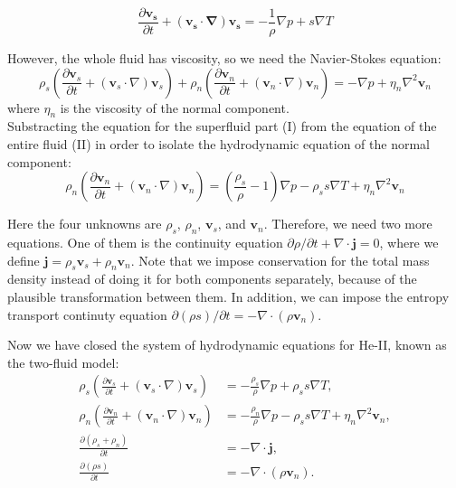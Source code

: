 \documentclass{article}
\begin{document}
\[\frac{\partial \mathbf{v_s}}{\partial t} + (\mathbf{v_s}\cdot \mathbf{\nabla})\mathbf{v_s} = -\frac{1}{\rho}\nabla p + s \nabla T \tag{I}\]

However, the whole fluid has viscosity, so we need the Navier-Stokes equation:
\[
\rho_s \left( \frac{\partial \mathbf{v}_s}{\partial t} + (\mathbf{v}_s \cdot \nabla) \mathbf{v}_s \right) + \rho_n \left( \frac{\partial \mathbf{v}_n}{\partial t} + (\mathbf{v}_n \cdot \nabla) \mathbf{v}_n \right) = -\nabla p + \eta_n \nabla^2 \mathbf{v}_n \tag{II}
\]
where $\eta_n$ is the viscosity of the normal component.
\\

Substracting the equation for the superfluid part (I) from the equation of the entire fluid (II) in order to isolate the hydrodynamic equation of the normal component:
\[
\rho_n \left( \frac{\partial \mathbf{v}_n}{\partial t} + (\mathbf{v}_n \cdot \nabla) \mathbf{v}_n \right) = \left( \frac{\rho_s}{\rho} - 1 \right) \nabla p - \rho_s s \nabla T + \eta_n \nabla^2 \mathbf{v}_n \]

Here the four unknowns are $\rho_s$, $\rho_n$, $\mathbf{v}_s$, and $\mathbf{v}_n$. Therefore, we need two more equations. One of them is the continuity equation $\partial \rho / \partial t + \nabla \cdot \mathbf{j} = 0$, where we define $\mathbf{j} = \rho_s \mathbf{v}_s + \rho_n \mathbf{v}_n $. Note that we impose conservation for the total mass density instead of doing it for both components separately, because of the plausible transformation between them. In addition, we can impose the entropy transport continuty equation $\partial (\rho s) / \partial t = - \nabla \cdot (\rho \mathbf{v}_n)$.

Now we have closed the system of hydrodynamic equations for He-II, known as the two-fluid model:
\begin{align}
\rho_s \left( \frac{\partial \mathbf{v}_s}{\partial t} + (\mathbf{v}_s \cdot \nabla) \mathbf{v}_s \right) &= -\frac{\rho_s}{\rho} \nabla p + \rho_s s \nabla T,  \\
\rho_n \left( \frac{\partial \mathbf{v}_n}{\partial t} + (\mathbf{v}_n \cdot \nabla) \mathbf{v}_n \right) &= -\frac{\rho_n}{\rho} \nabla p - \rho_s s \nabla T + \eta_n \nabla^2 \mathbf{v}_n,  \\
\frac{\partial (\rho_s + \rho_n)}{\partial t} &= -\nabla \cdot \mathbf{j}, \\
\frac{\partial (\rho s)}{\partial t} &= -\nabla \cdot (\rho \mathbf{v}_n). 
\end{align}
\end{document}
